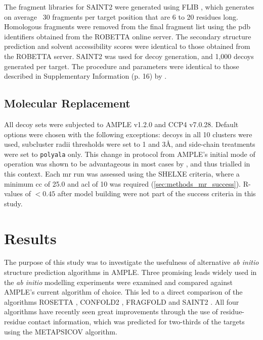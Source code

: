 The fragment libraries for SAINT2 were generated using FLIB \cite{De_Oliveira2015-kb}, which generates on average ~30 fragments per target position that are 6 to 20 residues long. Homologous fragments were removed from the final fragment list using the \gls{pdb} identifiers obtained from the ROBETTA online server. The secondary structure prediction and solvent accessibility scores were identical to those obtained from the ROBETTA server. SAINT2 was used for decoy generation, and 1,000 decoys generated per target. The procedure and parameters were identical to those described in Supplementary Information (p. 16) by \textcite{De_Oliveira2017-sg}.

\subsection{Molecular Replacement}
All decoy sets were subjected to AMPLE v1.2.0 and CCP4 v7.0.28. Default options were chosen with the following exceptions: decoys in all 10 clusters were used, subcluster radii thresholds were set to 1 and 3\AA, and side-chain treatments were set to \texttt{polyala} only. This change in protocol from AMPLE's initial mode of operation \cite{Bibby2012-lm} was shown to be advantageous in most cases by \textcite{Thomas2017-qu}, and thus trialled in this context.  Each \gls{mr} run was assessed using the SHELXE criteria, where a minimum \gls{cc} of 25.0 and \gls{acl} of 10 was required (\cref{sec:methods_mr_success}). R-values of $<0.45$ after model building were not part of the success criteria in this study.

\section{Results}
The purpose of this study was to investigate the usefulness of alternative \textit{ab initio} structure prediction algorithms in AMPLE. Three promising leads widely used in the \textit{ab initio} modelling experiments were examined and compared against AMPLE's current algorithm of choice. This led to a direct comparison of the algorithms ROSETTA \cite{Rohl2004-dj}, CONFOLD2 \cite{Adhikari2018-lj}, FRAGFOLD \cite{Jones2001-mc} and SAINT2 \cite{De_Oliveira2017-sg}. All four algorithms have recently seen great improvements through the use of residue-residue contact information, which was predicted for two-thirds of the targets using the METAPSICOV \cite{Jones2015-vq} algorithm.

